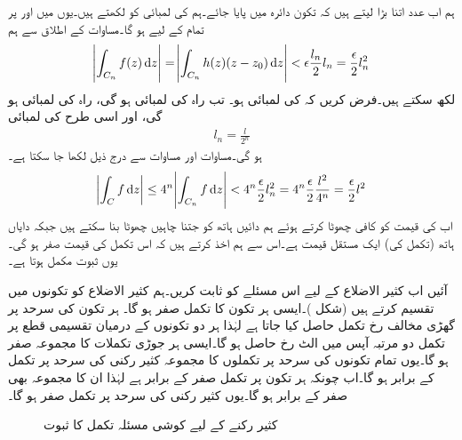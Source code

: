 ہم اب عدد  اتنا بڑا لیتے ہیں کہ تکون  دائرہ  میں پایا جائے۔ہم  کی لمبائی کو  لکھتے ہیں۔یوں  میں  اور   پر تمام  کے لیے   ہو گا۔مساوات  کے اطلاق سے ہم 
\begin{align}\label{مساوات_مخلوط_تکمل_قریبی_حد}
\abs{\int_{C_n} f(z)\dif z}=\abs{\int_{C_n} h(z)(z-z_0)\dif z}<\epsilon \frac{l_n}{2}l_n=\frac{\epsilon}{2}l_n^2 
\end{align}
لکھ سکتے ہیں۔فرض کریں کہ  کی لمبائی  ہو۔ تب راہ  کی لمبائی  ہو گی، راہ  کی لمبائی 
 ہو گی، اور اسی طرح  کی لمبائی 
\begin{align*}
l_n=\frac{l}{2^n}
\end{align*}
ہو گی۔مساوات  اور مساوات  سے درج ذیل لکھا جا سکتا ہے۔
\begin{align*}
\abs{\int_C f\dif z}\le 4^n \abs{\int_{C_n} f\dif z}< 4^n \frac{\epsilon}{2}l_n^2=4^n \frac{\epsilon}{2} \frac{l^2}{4^n}=\frac{\epsilon}{2}l^2
\end{align*}
اب  کی قیمت کو کافی چھوٹا  کرتے ہوئے ہم دائیں ہاتھ کو جتنا چاہیں چھوٹا بنا سکتے ہیں جبکہ دایاں ہاتھ (تکمل کی) ایک مستقل قیمت ہے۔اس سے ہم اخذ کرتے ہیں کہ اس تکمل کی قیمت صفر ہو گی۔یوں ثبوت مکمل ہوتا ہے۔

آئیں اب کثیر الاضلاع کے لیے اس مسئلے کو ثابت کریں۔ہم کثیر الاضلاع کو تکونوں میں تقسیم کرتے ہیں (شکل )۔ایسی ہر تکون کا تکمل صفر ہو گا۔ ہر تکون کی سرحد پر گھڑی مخالف  رخ تکمل حاصل کیا جاتا ہے لہٰذا ہر دو تکونوں کے درمیان تقسیمی قطع پر تکمل دو مرتبہ آپس میں الٹ رخ حاصل ہو گا۔ایسی ہر جوڑی تکملات کا مجموعہ صفر ہو گا۔یوں تمام تکونوں کی سرحد پر تکملوں کا مجموعہ کثیر رکنی کی سرحد پر تکمل کے برابر ہو گا۔اب چونکہ ہر تکون پر تکمل صفر کے برابر  ہے لہٰذا ان کا مجموعہ بھی صفر کے برابر ہو گا۔یوں کثیر رکنی کی سرحد پر تکمل صفر ہو گا۔
\begin{figure}
\centering
{}
\caption{کثیر رکنے کے لیے کوشی مسئلہ تکمل کا ثبوت}
\label{شکل_مخلوط_تکمل_کثیر_رکنی_کی_سرحد}
\end{figure}

